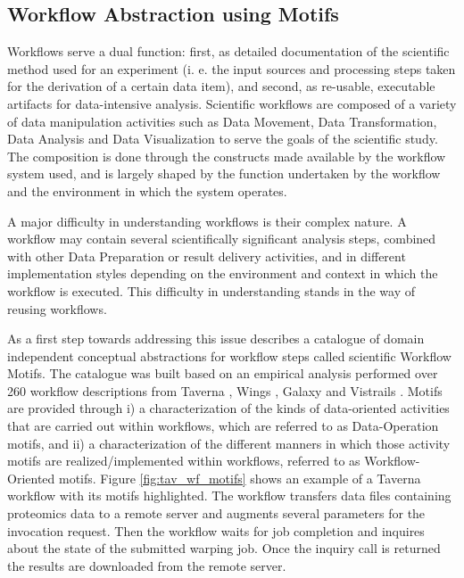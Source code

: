 \subsection{Workflow Abstraction using Motifs}
\label{sec:abstraction}
Workflows serve a dual function: first, as detailed documentation of the scientific method used for an experiment (i. e. the input sources and processing steps taken for the derivation of a certain data item), and second, as re-usable, executable artifacts for data-intensive analysis. 
Scientific workflows are composed of a variety of data manipulation activities such as Data Movement, Data Transformation, Data Analysis and Data Visualization to serve the goals of the scientific study. The composition is done through the constructs made available by the workflow system used, and is largely shaped by the function undertaken by the workflow and the environment in which the system operates.

A major difficulty in understanding workflows is their complex nature. A workflow may contain several scientifically significant analysis steps, combined with other Data Preparation or result delivery activities, and in different implementation styles depending on the environment and context in which the workflow is executed. This difficulty in understanding stands in the way of reusing workflows.

As a first step towards addressing this issue \cite{garijo_Alper_2012} describes a catalogue of domain independent conceptual abstractions for workflow steps called scientific Workflow Motifs. The catalogue was built based on an empirical analysis performed over 260 workflow descriptions from Taverna \cite{taverna}, Wings \cite{DBLP:journals/expert/GilRKGGMD11}, Galaxy \cite{Goecks_Nekrutenko_Taylor_2010} and Vistrails \cite{Callahan06-vistrails}. Motifs are provided through i) a characterization of the kinds of data-oriented activities that are carried out within workflows, which are referred to as Data-Operation motifs, and ii) a characterization of the different manners in which those activity motifs are realized/implemented within workflows, referred to as Workflow-Oriented motifs. Figure \ref{fig:tav_wf_motifs} shows an example of a Taverna workflow with its motifs highlighted. The workflow transfers data files containing proteomics data to a remote server and  augments several parameters for the invocation request. Then the workflow waits for job completion and inquires about the state of the submitted warping job. Once the inquiry call is returned the results are downloaded from the remote server.

